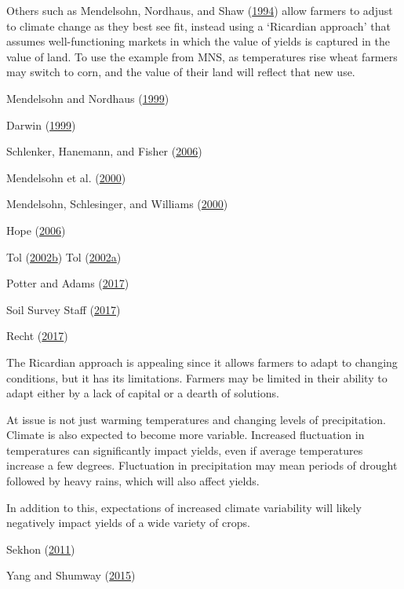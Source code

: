\documentclass[AER]{AEA}
\begin{document}
Others such as Mendelsohn, Nordhaus, and Shaw
(\protect\hyperlink{ref-MendelsohnNordhausShaw1994}{1994}) allow farmers
to adjust to climate change as they best see fit, instead using a
`Ricardian approach' that assumes well-functioning markets in which the
value of yields is captured in the value of land. To use the example
from MNS, as temperatures rise wheat farmers may switch to corn, and the
value of their land will reflect that new use.

Mendelsohn and Nordhaus
(\protect\hyperlink{ref-MendelsohnNordhaus1999}{1999})

Darwin (\protect\hyperlink{ref-Darwin1999}{1999})

Schlenker, Hanemann, and Fisher
(\protect\hyperlink{ref-SchlenkerHanemannFisher2006}{2006})

Mendelsohn et al. (\protect\hyperlink{ref-MendelsohnETAL2000}{2000})

Mendelsohn, Schlesinger, and Williams
(\protect\hyperlink{ref-MendelsohnSchlesingerWilliams2000}{2000})

Hope (\protect\hyperlink{ref-Hope2006}{2006})

Tol
(\protect\hyperlink{ref-Tol2002a}{2002}\protect\hyperlink{ref-Tol2002a}{b})
Tol
(\protect\hyperlink{ref-Tol2002b}{2002}\protect\hyperlink{ref-Tol2002b}{a})

Potter and Adams (\protect\hyperlink{ref-rnassqs}{2017})

Soil Survey Staff (\protect\hyperlink{ref-SSURGO}{2017})

Recht (\protect\hyperlink{ref-censusapi}{2017})

The Ricardian approach is appealing since it allows farmers to adapt to
changing conditions, but it has its limitations. Farmers may be limited
in their ability to adapt either by a lack of capital or a dearth of
solutions.

At issue is not just warming temperatures and changing levels of
precipitation. Climate is also expected to become more variable.
Increased fluctuation in temperatures can significantly impact yields,
even if average temperatures increase a few degrees. Fluctuation in
precipitation may mean periods of drought followed by heavy rains, which
will also affect yields.

In addition to this, expectations of increased climate variability will
likely negatively impact yields of a wide variety of crops.

Sekhon (\protect\hyperlink{ref-Sekhon2011}{2011})

Yang and Shumway (\protect\hyperlink{ref-YangShumway2015}{2015})
\end{document}
